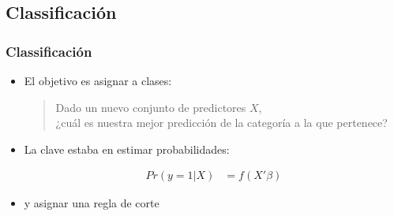 \documentclass[
  shownotes,
  xcolor={svgnames},
  hyperref={colorlinks,citecolor=DarkBlue,linkcolor=DarkRed,urlcolor=DarkBlue}
  , aspectratio=169]{beamer}
\begin{document}
\subsection{Classificación}
\begin{frame}[fragile]
\frametitle{Classificación}

\begin{itemize}
  \item El objetivo es asignar a clases:
\medskip
  \begin{quote}
  \centering
      Dado un nuevo conjunto de predictores $X$, \\ 
      ¿cuál es nuestra mejor predicción de la categoría a la que pertenece?
    \end{quote}
    \item La clave estaba en estimar probabilidades:

\medskip
    \begin{align}
    Pr(y=1|X) &= f(X'\beta) 
    \end{align}
\medskip
  \item y asignar una regla de corte 
\end{itemize}


\end{frame}
\end{document}
